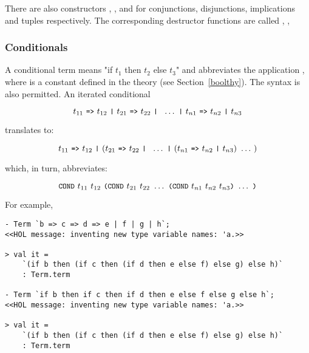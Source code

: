 \noindent There are also constructors
,
,
 and
for conjunctions, disjunctions, implications and tuples respectively.
The corresponding destructor functions are called , \etc,


\subsubsection{Conditionals}\label{conditionals}

A conditional
 term  means
"if $t_1$ then $t_2$ else
$t_3$" and abbreviates the application
, where 
is a constant defined in the theory  (see Section~\ref{boolthy}).
The syntax  is also permitted. An
iterated conditional 

\[
t_{11}\ \ml{=>}\ t_{12}\ \ml{|}\
t_{21}\ \ml{=>}\ t_{22}\ \ml{|}\
\ \ldots\ \ml{|}\
t_{n1}\ \ml{=>}\ t_{n2}\ \ml{|}\ t_{n3}
\]

\noindent translates to:

\[
t_{11}\ \ml{=>}\ t_{12}\ \ml{|}\
(t_{21}\ \ml{=>}\ t_{22}\ \ml{|}\
\ \ldots\ \ml{|}\
(t_{n1}\ \ml{=>}\ t_{n2}\ \ml{|}\ t_{n3})\ \ldots\ )
\]

\noindent which, in turn, abbreviates:

\[\ml{COND}\ t_{11}\ t_{12}\ \ml{(COND}\ t_{21}\ t_{22}\ \ldots\
\ml{(COND}\ t_{n1}\ t_{n2}\ t_{n3}\ml{)}\ \ldots\ \ml{)}\]

For example, 

\begin{session}\begin{verbatim}
- Term `b => c => d => e | f | g | h`;
<<HOL message: inventing new type variable names: 'a.>>

> val it =
    `(if b then (if c then (if d then e else f) else g) else h)`
    : Term.term

- Term `if b then if c then if d then e else f else g else h`;
<<HOL message: inventing new type variable names: 'a.>>

> val it =
    `(if b then (if c then (if d then e else f) else g) else h)`
    : Term.term
\end{verbatim}\end{session}

